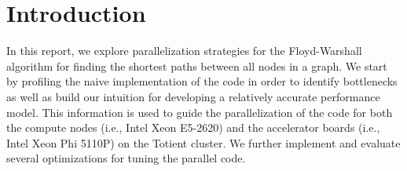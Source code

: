
\section{Introduction}
\label{sec-intro}

In this report, we explore parallelization strategies for the
Floyd-Warshall algorithm for finding the shortest paths between all nodes
in a graph. We start by profiling the naive implementation of the code in
order to identify bottlenecks as well as build our intuition for
developing a relatively accurate performance model. This information is
used to guide the parallelization of the code for both the compute nodes
(i.e., Intel Xeon E5-2620) and the accelerator boards (i.e., Intel Xeon
Phi 5110P) on the Totient cluster. We further implement and evaluate
several optimizations for tuning the parallel code.


